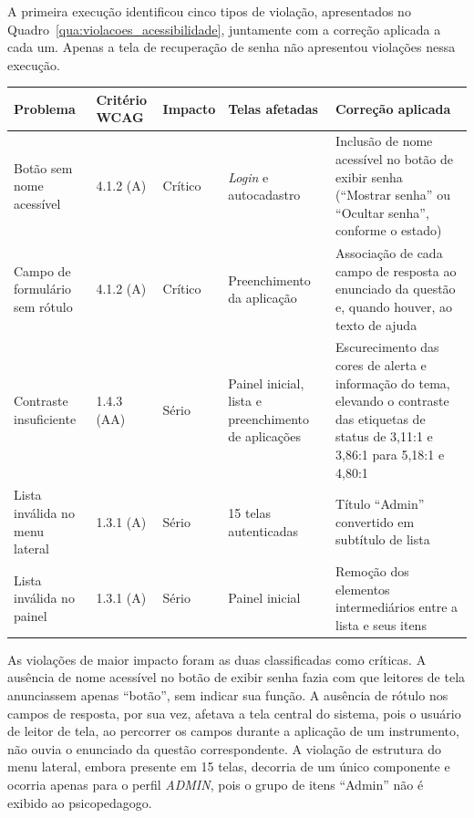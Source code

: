 A primeira execução identificou cinco tipos de violação, apresentados no Quadro~\ref{qua:violacoes_acessibilidade}, juntamente com a correção aplicada a cada um. Apenas a tela de recuperação de senha não apresentou violações nessa execução.

\begin{quadro}[H]
\centering
\footnotesize
\caption{Violações de acessibilidade identificadas pelo axe-core e correções aplicadas}
\begin{tabular}{|p{2.6cm}|p{1.5cm}|p{1.3cm}|p{2.8cm}|p{5.0cm}|}
\hline
\textbf{Problema} & \textbf{Critério WCAG} & \textbf{Impacto} & \textbf{Telas afetadas} & \textbf{Correção aplicada} \\
\hline
Botão sem nome acessível & 4.1.2 (A) & Crítico & \textit{Login} e autocadastro & Inclusão de nome acessível no botão de exibir senha (``Mostrar senha'' ou ``Ocultar senha'', conforme o estado) \\ \hline
Campo de formulário sem rótulo & 4.1.2 (A) & Crítico & Preenchimento da aplicação & Associação de cada campo de resposta ao enunciado da questão e, quando houver, ao texto de ajuda \\ \hline
Contraste insuficiente & 1.4.3 (AA) & Sério & Painel inicial, lista e preenchimento de aplicações & Escurecimento das cores de alerta e informação do tema, elevando o contraste das etiquetas de status de 3,11:1 e 3,86:1 para 5,18:1 e 4,80:1 \\ \hline
Lista inválida no menu lateral & 1.3.1 (A) & Sério & 15 telas autenticadas & Título ``Admin'' convertido em subtítulo de lista \\ \hline
Lista inválida no painel & 1.3.1 (A) & Sério & Painel inicial & Remoção dos elementos intermediários entre a lista e seus itens \\ \hline
\end{tabular}
\label{qua:violacoes_acessibilidade}
\end{quadro}

As violações de maior impacto foram as duas classificadas como críticas. A ausência de nome acessível no botão de exibir senha fazia com que leitores de tela anunciassem apenas ``botão'', sem indicar sua função. A ausência de rótulo nos campos de resposta, por sua vez, afetava a tela central do sistema, pois o usuário de leitor de tela, ao percorrer os campos durante a aplicação de um instrumento, não ouvia o enunciado da questão correspondente. A violação de estrutura do menu lateral, embora presente em 15 telas, decorria de um único componente e ocorria apenas para o perfil \textit{ADMIN}, pois o grupo de itens ``Admin'' não é exibido ao psicopedagogo.

